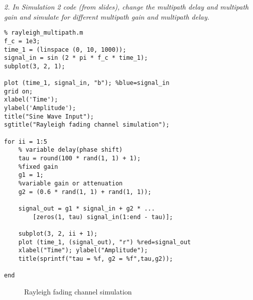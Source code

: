 \documentclass[a4paper]{article}
\begin{document}
\newpage
\textit{2. In Simulation 2 code (from slides), change the multipath delay and multipath gain and simulate for different multipath gain and multipath delay.}\\
\bigskip
{}
\begin{verbatim}
% rayleigh_multipath.m
f_c = 1e3;
time_1 = (linspace (0, 10, 1000));
signal_in = sin (2 * pi * f_c * time_1);
subplot(3, 2, 1);

plot (time_1, signal_in, "b"); %blue=signal_in
grid on;
xlabel('Time'); 
ylabel('Amplitude');
title("Sine Wave Input");
sgtitle("Rayleigh fading channel simulation");

for ii = 1:5
    % variable delay(phase shift)
    tau = round(100 * rand(1, 1) + 1); 
    %fixed gain
    g1 = 1; 
    %variable gain or attenuation
    g2 = (0.6 * rand(1, 1) + rand(1, 1));
    
    signal_out = g1 * signal_in + g2 * ...
        [zeros(1, tau) signal_in(1:end - tau)];
    
    subplot(3, 2, ii + 1);
    plot (time_1, (signal_out), "r") %red=signal_out
    xlabel("Time"); ylabel("Amplitude");
    title(sprintf("tau = %f, g2 = %f",tau,g2));
    
end
\end{verbatim}
\begin{figure}[hbt!]
    \centering
  
  \caption{Rayleigh fading channel simulation}
\end{figure}
\end{document}
